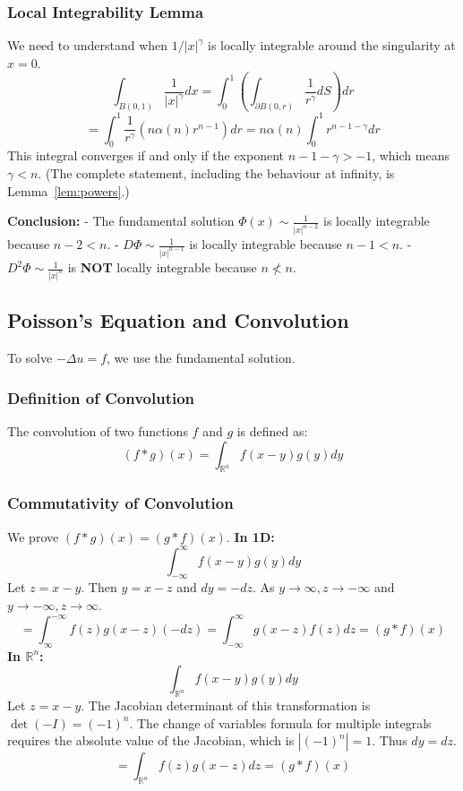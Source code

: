 \documentclass[11pt]{article}
\theoremstyle{plain}
\theoremstyle{definition}
\theoremstyle{remark}
\begin{document}
\subsubsection{Local Integrability Lemma}
We need to understand when $1/|x|^\gamma$ is locally integrable around the singularity at $x=0$.
$$ \int_{B(0,1)} \frac{1}{|x|^\gamma} dx = \int_0^1 \left( \int_{\partial B(0,r)} \frac{1}{r^\gamma} dS \right) dr $$
$$ = \int_0^1 \frac{1}{r^\gamma} \left( n \alpha(n) r^{n-1} \right) dr = n \alpha(n) \int_0^1 r^{n-1-\gamma} dr $$
This integral converges if and only if the exponent $n - 1 - \gamma > -1$, which means $\gamma < n$.
(The complete statement, including the behaviour at infinity, is Lemma~\ref{lem:powers}.)

\textbf{Conclusion:} 
- The fundamental solution $\Phi(x) \sim \frac{1}{|x|^{n-2}}$ is locally integrable because $n-2 < n$.
- $D\Phi \sim \frac{1}{|x|^{n-1}}$ is locally integrable because $n-1 < n$.
- $D^2\Phi \sim \frac{1}{|x|^n}$ is \textbf{NOT} locally integrable because $n \not< n$.

\subsection{Poisson's Equation and Convolution}
To solve $-\Delta u = f$, we use the fundamental solution.
\subsubsection{Definition of Convolution}
The convolution of two functions $f$ and $g$ is defined as:
$$ (f * g)(x) = \int_{\mathbb{R}^n} f(x-y) g(y) dy $$

\subsubsection{Commutativity of Convolution}
We prove $(f * g)(x) = (g * f)(x)$.
\textbf{In 1D:}
$$ \int_{-\infty}^\infty f(x-y) g(y) dy $$
Let $z = x - y$. Then $y = x - z$ and $dy = -dz$. As $y \to \infty, z \to -\infty$ and $y \to -\infty, z \to \infty$.
$$ = \int_{\infty}^{-\infty} f(z) g(x-z) (-dz) = \int_{-\infty}^\infty g(x-z) f(z) dz = (g * f)(x) $$
\textbf{In $\mathbb{R}^n$:}
$$ \int_{\mathbb{R}^n} f(x-y) g(y) dy $$
Let $z = x - y$. The Jacobian determinant of this transformation is $\det(-I) = (-1)^n$. The change of variables formula for multiple integrals requires the absolute value of the Jacobian, which is $|(-1)^n| = 1$. Thus $dy = dz$.
$$ = \int_{\mathbb{R}^n} f(z) g(x-z) dz = (g * f)(x) $$
\end{document}
